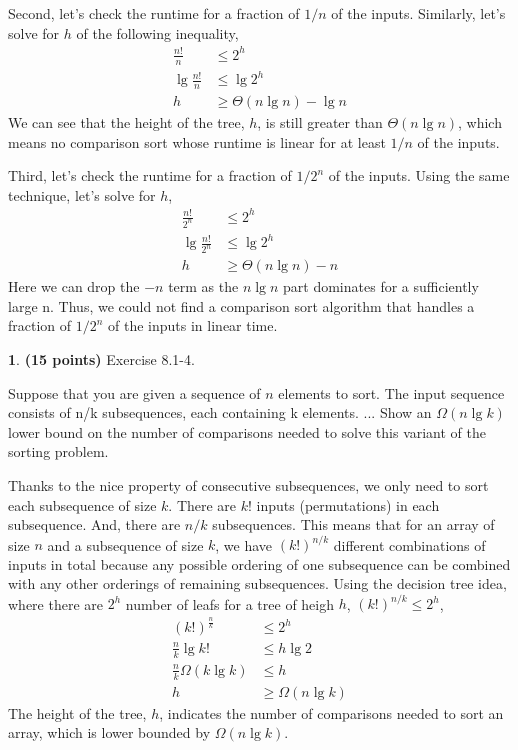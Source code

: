 \documentclass[11pt]{article}
\theoremstyle{definition}
\theoremstyle{theorem}
\newtheorem{prob}{}
\newcommand{\solution}{\medskip\noindent{\color{DarkBlue}\textbf{Solution:}}}
\begin{document}
Second, let's check the runtime for a fraction of $1/n$ of the inputs. Similarly, let's solve for $h$ of the following inequality,
\[
\begin{split}
\frac{n!}{n} & \le 2^h \\
\lg{\frac{n!}{n} } & \le \lg{2^h} \\
h & \ge \Theta{(n\lg n)} - \lg{n}
\end{split}
\]
We can see that the height of the tree, $h$, is still greater than $\Theta{(n\lg n)}$, which means no comparison sort whose runtime is linear for at least $1/n$ of the inputs.

Third, let's check the runtime for a fraction of $1/2^n$ of the inputs. Using the same technique, let's solve for $h$,
\[
\begin{split}
\frac{n!}{2^n} & \le 2^h \\
\lg{\frac{n!}{2^n} } & \le \lg{2^h} \\
h & \ge \Theta{(n\lg n)} - n
\end{split}
\]
Here we can drop the $-n$ term as the $n\lg n$ part dominates for a sufficiently large n. Thus, we could not find a comparison sort algorithm that handles a fraction of $1/2^n$ of the inputs in linear time.

\newpage
\begin{prob} \textbf{(15 points)} Exercise 8.1-4.
\end{prob}
Suppose that you are given a sequence of $n$ elements to sort. The input sequence consists of n/k subsequences, each containing k elements. ... Show an $\Omega{(n\lg{k})}$ lower bound on the number of comparisons needed to solve this variant of the sorting problem.

\solution

Thanks to the nice property of consecutive subsequences, we only need to sort each subsequence of size $k$. There are $k!$ inputs (permutations) in each subsequence. And, there are $n/k$ subsequences. This means that for an array of size $n$ and a subsequence of size $k$, we have $(k!)^{n/k}$ different combinations of inputs in total because any possible ordering of one subsequence can be combined with any other orderings of remaining subsequences. Using the decision tree idea, where there are $2^h$ number of leafs for a tree of heigh $h$, $(k!)^{n/k} \le 2^h$,
\[
\begin{split}
(k!)^{\frac{n}{k}} & \le 2^h \\
\frac{n}{k} \lg{k!} & \le h \lg {2} \\
\frac{n}{k} \Omega{(k\lg{k})} & \le h \\
h & \ge \Omega{(n\lg{k})} 
\end{split}
\]
The height of the tree, $h$, indicates the number of comparisons needed to sort an array, which is lower bounded by $\Omega{(n\lg{k})}$.
\end{document}
